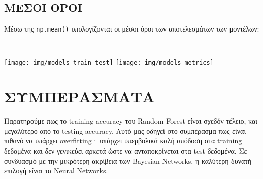 \subsection{ΜΕΣΟΙ ΟΡΟΙ}

        Μέσω της \texttt{np.mean()} υπολογίζονται οι μέσοι όροι των αποτελεσμάτων των μοντέλων:

        \begin{table}[ht] \noindent\centering\tt
        \end{table}

        \begin{multicols}{2} \centering \noindent
            \texttt{[image: img/models\_train\_test]}
            \texttt{[image: img/models\_metrics]}
        \end{multicols}

\section{ΣΥΜΠΕΡΑΣΜΑΤΑ}
    Παρατηρούμε πως το training accuracy του Random Forest είναι σχεδόν τέλειο, και μεγαλύτερο από το testing accuracy.
    Αυτό μας οδηγεί στο συμπέρασμα πως είναι πιθανό να υπάρχει overfitting· υπάρχει υπερβολικά καλή απόδοση στα training δεδομένα και δεν γενικεύει αρκετά ώστε να ανταποκρίνεται στα test δεδομένα.
    Σε συνδυασμό με την μικρότερη ακρίβεια των Bayesian Networks, η καλύτερη δυνατή επιλογή είναι τα Neural Networks.